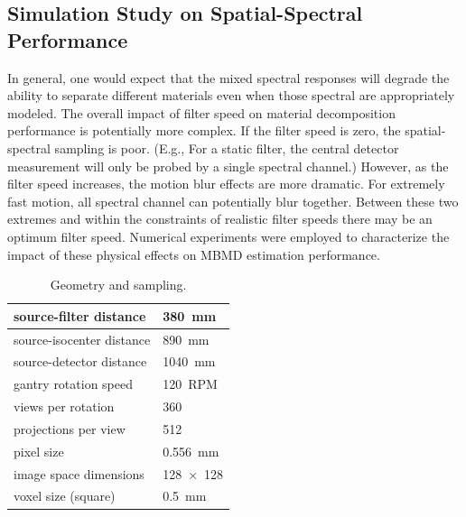 \documentclass[]{spie}  %
\begin{document}


\subsection{Simulation Study on Spatial-Spectral Performance}
In general, one would expect that the mixed spectral responses will degrade the ability to separate different materials even when those spectral are appropriately modeled. The overall impact of filter speed on material decomposition performance is potentially more complex. If the filter speed is zero, the spatial-spectral sampling is poor. (E.g., For a static filter, the central detector measurement will only be probed by a single spectral channel.) However, as the filter speed increases, the motion blur effects are more dramatic. For extremely fast motion, all spectral channel can potentially blur together. Between these two extremes and within the constraints of realistic filter speeds there may be an optimum filter speed. 
Numerical experiments were employed to characterize the impact of these physical effects on MBMD estimation performance. 


\begin{table}
\centering 
\begin{tabular}{|l|l|}
\hline
 source-filter distance & 380~mm \\ \hline
 source-isocenter distance & 890~mm \\ \hline
 source-detector distance & 1040~mm  \\ \hline
 gantry rotation speed & 120~RPM  \\ \hline 
 views per rotation & 360  \\ \hline
 projections per view & 512 \\ \hline
 pixel size & 0.556~mm  \\ \hline
 image space dimensions & 128~$\times$~128  \\ \hline
 voxel size (square) & 0.5~mm  \\ \hline
\end{tabular}
\caption{Geometry and sampling.}
\label{tab:CTgeom}
\end{table}
\normalsize
\end{document}
